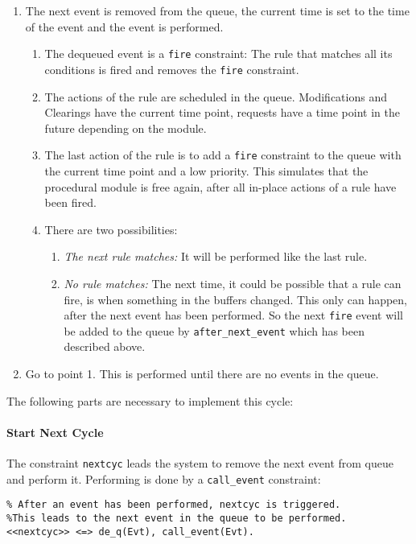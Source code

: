 \begin{enumerate}
 \item The next event is removed from the queue, the current time is set to the time of the event and the event is performed.
 \begin{enumerate}
 \item The dequeued event is a \lstinline|fire| constraint: The rule that matches all its conditions is fired and removes the \lstinline|fire| constraint.
 \item The actions of the rule are scheduled in the queue. Modifications and Clearings have the current time point, requests have a time point in the future depending on the module.
 \item The last action of the rule is to add a \lstinline|fire| constraint to the queue with the current time point and a low priority. This simulates that the procedural module is free again, after all in-place actions of a rule have been fired.
 \item There are two possibilities:
 \begin{enumerate}
  \item \emph{The next rule matches:} It will be performed like the last rule.
  \item \emph{No rule matches:} The next time, it could be possible that a rule can fire, is when something in the buffers changed. This only can happen, after the next event has been performed. So the next \lstinline|fire| event will be added to the queue by \lstinline|after_next_event| which has been described above.
 \end{enumerate}
  \end{enumerate}
 \item Go to point 1. This is performed until there are no events in the queue.
\end{enumerate}


The following parts are necessary to implement this cycle:

\paragraph{Start Next Cycle} 

The constraint \lstinline|nextcyc| leads the system to remove the next event from queue and perform it. Performing is done by a \lstinline|call_event| constraint:

\begin{lstlisting}
% After an event has been performed, nextcyc is triggered. 
%This leads to the next event in the queue to be performed.
<<nextcyc>> <=> de_q(Evt), call_event(Evt).
\end{lstlisting}

